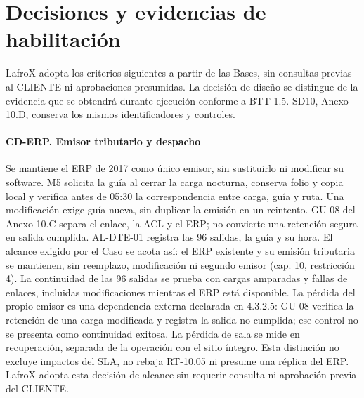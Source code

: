 \section{Decisiones y evidencias de habilitación}
\label{anx:X-cierre}
LafroX adopta los criterios siguientes a partir de las Bases, sin consultas previas al CLIENTE ni aprobaciones presumidas. La decisión de diseño se distingue de la evidencia que se obtendrá durante ejecución conforme a BTT 1.5. SD10, Anexo 10.D, conserva los mismos identificadores y controles.

\paragraph*{CD-ERP. Emisor tributario y despacho}
Se mantiene el ERP de 2017 como único emisor, sin sustituirlo ni modificar su software. M5 solicita la guía al cerrar la carga nocturna, conserva folio y copia local y verifica antes de 05:30 la correspondencia entre carga, guía y ruta. Una modificación exige guía nueva, sin duplicar la emisión en un reintento. GU-08 del Anexo 10.C separa el enlace, la ACL y el ERP; no convierte una retención segura en salida cumplida. AL-DTE-01 registra las 96 salidas, la guía y su hora. El alcance exigido por el Caso se acota así: el ERP existente y su emisión tributaria se mantienen, sin reemplazo, modificación ni segundo emisor (cap. 10, restricción 4). La continuidad de las 96 salidas se prueba con cargas amparadas y fallas de enlaces, incluidas modificaciones mientras el ERP está disponible. La pérdida del propio emisor es una dependencia externa declarada en 4.3.2.5: GU-08 verifica la retención de una carga modificada y registra la salida no cumplida; ese control no se presenta como continuidad exitosa. La pérdida de sala se mide en recuperación, separada de la operación con el sitio íntegro. Esta distinción no excluye impactos del SLA, no rebaja RT-10.05 ni presume una réplica del ERP. LafroX adopta esta decisión de alcance sin requerir consulta ni aprobación previa del CLIENTE.

